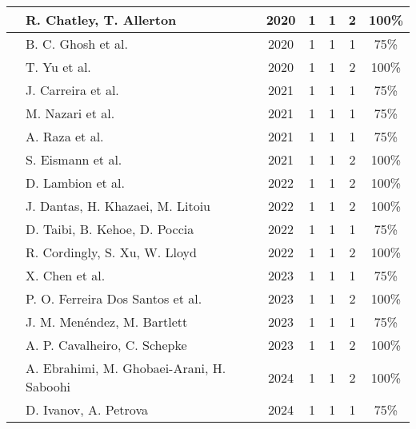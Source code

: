 \begin{table}[htbp]
\begin{tabularx}{\textwidth}{|c| >{\raggedright\arraybackslash}X |c|c|c|c|c|}
    \hline
    \cite{10.1145/3377812.3382135} & R. Chatley, T. Allerton & 2020 & 1 & 1 & 2 & 100\% \\
    \hline
    \cite{9027427} & B. C. Ghosh et al. & 2020 & 1 & 1 & 1 & 75\% \\
    \hline
    \cite{10.1145/3419111.3421280} & T. Yu et al. & 2020 & 1 & 1 & 2 & 100\% \\
    \hline
    \cite{10.1145/3458336.3465305} & J. Carreira et al. & 2021 & 1 & 1 & 1 & 75\% \\
    \hline
    \cite{9732138} & M. Nazari et al. & 2021 & 1 & 1 & 1 & 75\% \\
    \hline
    \cite{raza2021sok} & A. Raza et al. & 2021 & 1 & 1 & 1 & 75\% \\
    \hline
    \cite{eismann2021reviewserverlessusecases} & S. Eismann et al. & 2021 & 1 & 1 & 2 & 100\% \\
    \hline
    \cite{10.1145/3491204.3543506} & D. Lambion et al. & 2022 & 1 & 1 & 2 & 100\% \\
    \hline
    \cite{9860368} & J. Dantas, H. Khazaei, M. Litoiu & 2022 & 1 & 1 & 2 & 100\% \\
    \hline
    \cite{9912641} & D. Taibi, B. Kehoe, D. Poccia & 2022 & 1 & 1 & 1 & 75\% \\
    \hline
    \cite{9946331} & R. Cordingly, S. Xu, W. Lloyd & 2022 & 1 & 1 & 2 & 100\% \\
    \hline
    \cite{10.1145/3631295.3631394} & X. Chen et al. & 2023 & 1 & 1 & 1 & 75\% \\
    \hline
    \cite{FerreiraDosSantos2023} & P. O. Ferreira Dos Santos et al. & 2023 & 1 & 1 & 2 & 100\% \\
    \hline
    \cite{menéndez2023performancebestpracticesusing} & J. M. Menéndez, M. Bartlett & 2023 & 1 & 1 & 1 & 75\% \\
    \hline
    \cite{Cavalheiro202389} & A. P. Cavalheiro, C. Schepke & 2023 & 1 & 1 & 2 & 100\% \\
    \hline
    \cite{EBRAHIMI2024103115} & A. Ebrahimi, M. Ghobaei-Arani, H. Saboohi & 2024 & 1 & 1 & 2 & 100\% \\
    \hline
    \cite{Ivanov_Petrova_2024} & D. Ivanov, A. Petrova & 2024 & 1 & 1 & 1 & 75\% \\
    \hline
    \end{tabularx}
    \label{table:research_papers_results}
\end{table}
